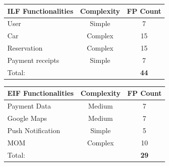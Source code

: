 \documentclass{article}
\begin{document}
	
			\renewcommand{\arraystretch}{1.2}
			\setlength{\tabcolsep}{12pt}
			\begin{center}
				\begin{tabular}{| p{7cm} | p{2.5cm} | p{1.8cm} |}\hline
					\textbf{ILF Functionalities} & \multicolumn{1}{|c|}{\textbf{Complexity}} & \textbf{FP Count}\\\hline
					User & \multicolumn{1}{|c|}{Simple} & \multicolumn{1}{|c|}{7}\\\hline
					Car & \multicolumn{1}{|c|}{Complex} & \multicolumn{1}{|c|}{15}\\\hline
					Reservation & \multicolumn{1}{|c|}{Complex} & \multicolumn{1}{|c|}{15}\\\hline
					Payment receipts & \multicolumn{1}{|c|}{Simple} & \multicolumn{1}{|c|}{7}\\\hline
					\multicolumn{2}{|l|}{Total:} & \multicolumn{1}{|c|}{\textbf{44}}\\\hline	
				\end{tabular}
			\end{center}
		
			\renewcommand{\arraystretch}{1.2}
			\setlength{\tabcolsep}{12pt}
			\begin{center}
				\begin{tabular}{| p{7cm} | p{2.5cm} | p{1.8cm} |}\hline
					\textbf{EIF Functionalities} & \multicolumn{1}{|c|}{\textbf{Complexity}} & \textbf{FP Count}\\\hline						
					Payment Data & \multicolumn{1}{|c|}{Medium} & \multicolumn{1}{|c|}{7}\\\hline
					Google Maps & \multicolumn{1}{|c|}{Medium} & \multicolumn{1}{|c|}{7}\\\hline
					Push Notification & \multicolumn{1}{|c|}{Simple} & \multicolumn{1}{|c|}{5}\\\hline	
					MOM & \multicolumn{1}{|c|}{Complex} & \multicolumn{1}{|c|}{10}\\\hline
					\multicolumn{2}{|l|}{Total:} & \multicolumn{1}{|c|}{\textbf{29}}\\\hline	
				\end{tabular}
			\end{center}
		
\end{document}
